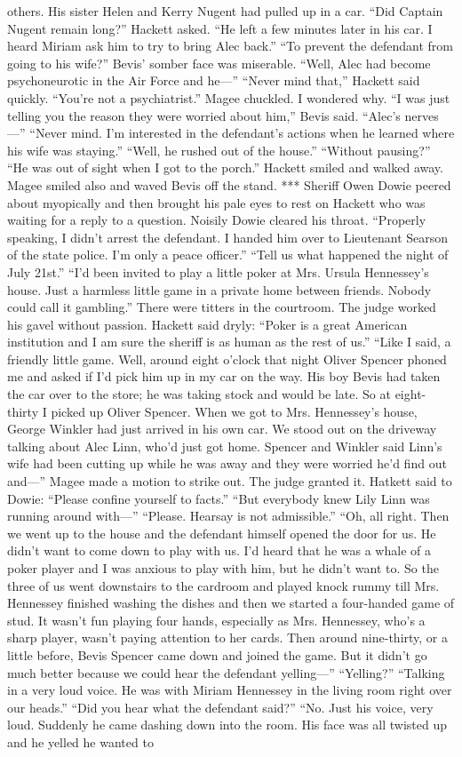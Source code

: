 \documentclass{novel}
\begin{document}
others. His sister Helen and Kerry Nugent had pulled up in a car. “Did Captain Nugent remain long?” Hackett asked. “He left a few minutes later in his car. I heard Miriam ask him to try to bring Alec back.” “To prevent the defendant from going to his wife?” Bevis’ somber face was miserable. “Well, Alec had become psychoneurotic in the Air Force and he—” “Never mind that,” Hackett said quickly. “You’re not a psychiatrist.” Magee chuckled. I wondered why. “I was just telling you the reason they were worried about him,” Bevis said. “Alec’s nerves—” “Never mind. I’m interested in the defendant’s actions when he learned where his wife was staying.” “Well, he rushed out of the house.” “Without pausing?” “He was out of sight when I got to the porch.” Hackett smiled and walked away. Magee smiled also and waved Bevis off the stand. *** Sheriff Owen Dowie peered about myopically and then brought his pale eyes to rest on Hackett who was waiting for a reply to a question. Noisily Dowie cleared his throat. “Properly speaking, I didn’t arrest the defendant. I handed him over to Lieutenant Searson of the state police. I’m only a peace officer.” “Tell us what happened the night of July 21st.” “I’d been invited to play a little poker at Mrs. Ursula Hennessey’s house. Just a harmless little game in a private home between friends. Nobody could call it gambling.” There were titters in the courtroom. The judge worked his gavel without passion. Hackett said dryly: “Poker is a great American institution and I am sure the sheriff is as human as the rest of us.” “Like I said, a friendly little game. Well, around eight o’clock that night Oliver Spencer phoned me and asked if I’d pick him up in my car on the way. His boy Bevis had taken the car over to the store; he was taking stock and would be late. So at eight-thirty I picked up Oliver Spencer. When we got to Mrs. Hennessey’s house, George Winkler had just arrived in his own car. We stood out on the driveway talking about Alec Linn, who’d just got home. Spencer and Winkler said Linn’s wife had been cutting up while he was away and they were worried he’d find out and—” Magee made a motion to strike out. The judge granted it. Hatkett said to Dowie: “Please confine yourself to facts.” “But everybody knew Lily Linn was running around with—” “Please. Hearsay is not admissible.” “Oh, all right. Then we went up to the house and the defendant himself opened the door for us. He didn’t want to come down to play with us. I’d heard that he was a whale of a poker player and I was anxious to play with him, but he didn’t want to. So the three of us went downstairs to the cardroom and played knock rummy till Mrs. Hennessey finished washing the dishes and then we started a four-handed game of stud. It wasn’t fun playing four hands, especially as Mrs. Hennessey, who’s a sharp player, wasn’t paying attention to her cards. Then around nine-thirty, or a little before, Bevis Spencer came down and joined the game. But it didn’t go much better because we could hear the defendant yelling—” “Yelling?” “Talking in a very loud voice. He was with Miriam Hennessey in the living room right over our heads.” “Did you hear what the defendant said?” “No. Just his voice, very loud. Suddenly he came dashing down into the room. His face was all twisted up and he yelled he wanted to 
\end{document}
